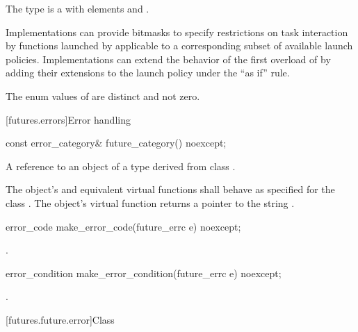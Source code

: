 \pnum
The  type  is a  with
elements  and .
\begin{note}
Implementations can provide bitmasks to specify restrictions on task
interaction by functions launched by  applicable to a
corresponding subset of available launch policies. Implementations can extend
the behavior of the first overload of  by adding their extensions
to the launch policy under the ``as if'' rule.
\end{note}

\pnum
The enum values of  are distinct and not zero.

[futures.errors]{Error handling}

%
\begin{itemdecl}
const error_category& future_category() noexcept;
\end{itemdecl}

\begin{itemdescr}
\pnum
\returns
A reference to an object of a type derived from class .

\pnum
The object's  and equivalent virtual functions shall
behave as specified for the class . The object's 
virtual function returns a pointer to the string .
\end{itemdescr}

%
\begin{itemdecl}
error_code make_error_code(future_errc e) noexcept;
\end{itemdecl}

\begin{itemdescr}
\pnum
\returns
{}.
\end{itemdescr}

%
\begin{itemdecl}
error_condition make_error_condition(future_errc e) noexcept;
\end{itemdecl}

\begin{itemdescr}
\pnum
\returns
{}.
\end{itemdescr}

[futures.future.error]{Class }

